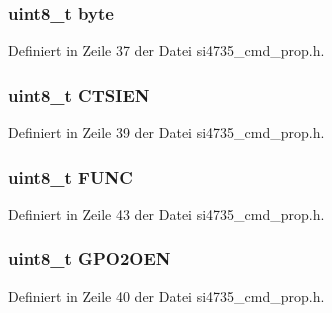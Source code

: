 \subsubsection[{byte}]{\setlength{\rightskip}{0pt plus 5cm}uint8\+\_\+t byte}\label{unionpower__up__arg1_a96f44d20f1dbf1c8785a7bc99a46164c}


Definiert in Zeile 37 der Datei si4735\+\_\+cmd\+\_\+prop.\+h.

\hypertarget{unionpower__up__arg1_a4454e61ca41936d70ce251c7aa931f60}{}
\subsubsection[{C\+T\+S\+I\+E\+N}]{\setlength{\rightskip}{0pt plus 5cm}uint8\+\_\+t C\+T\+S\+I\+E\+N}\label{unionpower__up__arg1_a4454e61ca41936d70ce251c7aa931f60}


Definiert in Zeile 39 der Datei si4735\+\_\+cmd\+\_\+prop.\+h.

\hypertarget{unionpower__up__arg1_a0aab01836b450d01cbad756334c65fab}{}
\subsubsection[{F\+U\+N\+C}]{\setlength{\rightskip}{0pt plus 5cm}uint8\+\_\+t F\+U\+N\+C}\label{unionpower__up__arg1_a0aab01836b450d01cbad756334c65fab}


Definiert in Zeile 43 der Datei si4735\+\_\+cmd\+\_\+prop.\+h.

\hypertarget{unionpower__up__arg1_aa16577946f684dfeeee75c5552b2cf32}{}
\subsubsection[{G\+P\+O2\+O\+E\+N}]{\setlength{\rightskip}{0pt plus 5cm}uint8\+\_\+t G\+P\+O2\+O\+E\+N}\label{unionpower__up__arg1_aa16577946f684dfeeee75c5552b2cf32}


Definiert in Zeile 40 der Datei si4735\+\_\+cmd\+\_\+prop.\+h.

